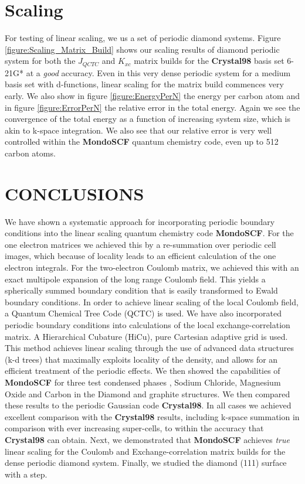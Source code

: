 \documentclass[prb,aps,nobibnotes,twocolumn,doublespace,twocolumngrid,superbib]{revtex4}
\begin{document}
\section{Scaling}

For testing of linear scaling, we us a set of periodic diamond systems.
Figure \ref{figure:Scaling_Matrix_Build} shows our scaling results
of diamond periodic system for both the \( J_{QCTC} \) and \( K_{xc} \)
matrix builds for the \textbf{Crystal98} basis set 6-21G* \cite{C98Basis}
at a {\it good} accuracy. Even in this very dense periodic system for a medium 
basis set with d-functions, linear scaling for the matrix build commences very 
early. We also show in figure \ref{figure:EnergyPerN} the energy per carbon atom and 
in figure \ref{figure:ErrorPerN} the relative error in the total energy. 
Again we see the convergence of the total energy
as a function of increasing system size, which is akin to k-space integration. We also
see that our relative error is very well controlled within the \textbf{MondoSCF} quantum
chemistry code, even up to 512 carbon atoms.


\section{CONCLUSIONS}

We have shown a systematic approach for incorporating periodic boundary conditions
into the linear scaling quantum chemistry code {\bf MondoSCF}.
For the one electron matrices we achieved this by a re-summation
over periodic cell images, which because of locality leads to an efficient
calculation of the one electron integrals. 
For the two-electron Coulomb
matrix, we achieved this with an exact multipole expansion of
the long range Coulomb field. 
This yields a spherically summed boundary
condition that is easily transformed to Ewald boundary conditions.
In order to achieve linear scaling of the local Coulomb field, a Quantum
Chemical Tree Code (QCTC) is used. 
We have also incorporated periodic
boundary conditions into calculations of the local exchange-correlation
matrix. 
A Hierarchical Cubature (HiCu), pure Cartesian adaptive grid
is used. 
This method achieves linear scaling through the use of advanced
data structures (k-d trees) that maximally exploits locality of the
density, and allows for an efficient treatment of the periodic effects.
%
We then showed the capabilities of \textbf{MondoSCF} for three test condensed
phases , Sodium Chloride, Magnesium Oxide and Carbon in the Diamond
and graphite structures. We then compared these results to the periodic
Gaussian code \textbf{Crystal98}. 
In all cases we achieved excellent comparison with the  \textbf{Crystal98}
results, including k-space summation in comparison with ever 
increasing super-cells, to within the accuracy that \textbf{Crystal98} can obtain.
%
Next, we demonstrated that \textbf{MondoSCF} achieves {\it true} linear scaling
for the Coulomb and Exchange-correlation matrix builds for
the dense periodic diamond system.
%
Finally, we studied the diamond (111) surface with a step.
%
\end{document}
